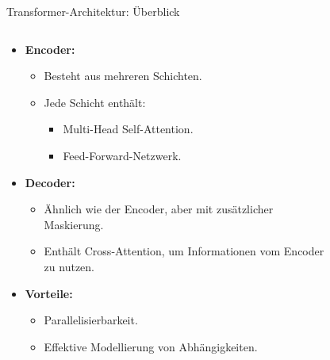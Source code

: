 \documentclass[aspectratio=1610, xcolor=dvipsnames, 9pt]{beamer}
\begin{document}
\begin{frame}{Transformer-Architektur: Überblick}
  \begin{columns}
    \begin{column}{0.7\textwidth}
      \begin{itemize}
        \item \textbf{Encoder:}
          \begin{itemize}
            \item Besteht aus mehreren Schichten.
            \item Jede Schicht enthält:
              \begin{itemize}
                \item Multi-Head Self-Attention.
                \item Feed-Forward-Netzwerk.
              \end{itemize}
          \end{itemize}
        \item \textbf{Decoder:}
          \begin{itemize}
            \item Ähnlich wie der Encoder, aber mit zusätzlicher Maskierung.
            \item Enthält Cross-Attention, um Informationen vom Encoder zu nutzen.
          \end{itemize}
        \item \textbf{Vorteile:}
          \begin{itemize}
            \item Parallelisierbarkeit.
            \item Effektive Modellierung von Abhängigkeiten.
          \end{itemize}
      \end{itemize}
    \end{column}
    \begin{column}{0.3\textwidth}
      \begin{figure}
        \centering

\end{figure}
\end{column}
\end{columns}
\end{frame}
\end{document}
